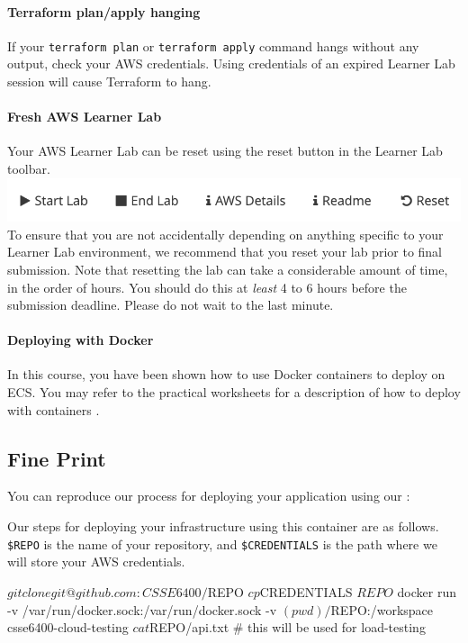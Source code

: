 \documentclass{csse4400}
\begin{document}
\paragraph{Terraform plan/apply hanging}
If your \texttt{terraform plan} or \texttt{terraform apply} command hangs without any output, check your AWS credentials. Using credentials of an expired Learner Lab session will cause Terraform to hang.

\paragraph{Fresh AWS Learner Lab}
Your AWS Learner Lab can be reset using the reset button in the Learner Lab toolbar.
\includegraphics[width=\textwidth]{images/reset-button.png}
To ensure that you are not accidentally depending on anything specific to your Learner Lab environment, we recommend that you reset your lab prior to final submission. Note that resetting the lab can take a considerable amount of time, in the order of hours. You should do this at \textit{least} 4 to 6 hours before the submission deadline. Please do not wait to the last minute.

\paragraph{Deploying with Docker}
In this course, you have been shown how to use Docker containers to deploy on ECS. You may refer to the practical worksheets for a description of how to deploy with containers \cite{prac-week5}.

\subsection{Fine Print}
You can reproduce our process for deploying your application using our :

Our steps for deploying your infrastructure using this container are as follows.
\texttt{\$REPO} is the name of your repository, and
\texttt{\$CREDENTIALS} is the path where we will store your AWS credentials.
\begin{code}[language=shell]{}
$ git clone git@github.com:CSSE6400/$REPO
$ cp $CREDENTIALS $REPO
$ docker run -v /var/run/docker.sock:/var/run/docker.sock -v $(pwd)/$REPO:/workspace csse6400-cloud-testing
$ cat $REPO/api.txt # this will be used for load-testing
\end{code}
\end{document}
